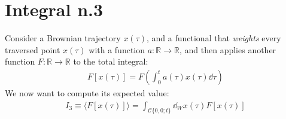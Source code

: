 \documentclass[../template.tex]{subfiles}
\begin{document}
\section{Integral n.3}
Consider a Brownian trajectory $x(\tau)$, and a functional that \textit{weights} every traversed point $x(\tau)$ with a function $a\colon \mathbb{R} \to \mathbb{R}$, and then applies another function $F\colon \mathbb{R} \to \mathbb{R}$ to the total integral:
\begin{align*}
    F[x(\tau)] = F\left(\int_0^t a(\tau) x(\tau) \dd{\tau}\right)
\end{align*}    
We now want to compute its expected value:
\begin{align*}
    I_3 \equiv \langle F[x(\tau)] \rangle = \int_{\mathcal{C}\{0,0;t\}} \dd{_Wx(\tau)} F[x(\tau)]
\end{align*}
\end{document}
